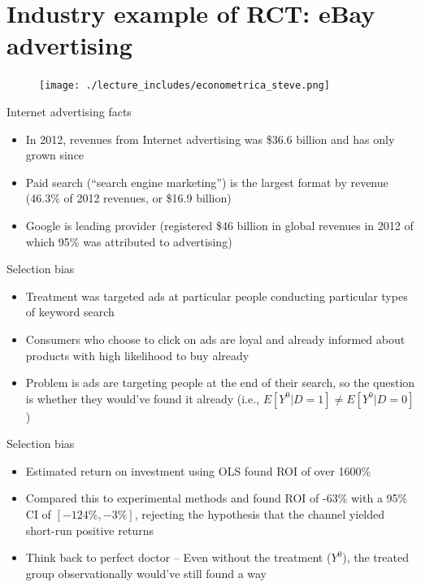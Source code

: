 \documentclass{beamer}
\begin{document}
\section{Industry example of RCT: eBay advertising}

\begin{frame}

\begin{figure}[hpt]
\begin{center}
\texttt{[image: ./lecture\_includes/econometrica\_steve.png]}
\end{center}
\end{figure}

\end{frame}

\begin{frame}{Internet advertising facts}

\begin{itemize}
\item In 2012, revenues from Internet advertising was \$36.6 billion and has only grown since
\item Paid search (``search engine marketing'') is the largest format by revenue (46.3\% of 2012 revenues, or \$16.9 billion)
\item Google is leading provider (registered \$46 billion in global revenues in 2012 of which 95\% was attributed to advertising)
\end{itemize}

\end{frame}

\begin{frame}{Selection bias}

\begin{itemize}
\item Treatment was targeted ads at particular people conducting particular types of keyword search
\item Consumers who choose to click on ads are loyal and already informed about products with high likelihood to buy already 
\item Problem is ads are targeting people at the end of their search, so the question is whether they would've found it already (i.e., $E[Y^0|D=1] \neq E[Y^0|D=0]$)
\end{itemize}


\end{frame}



\begin{frame}{Selection bias}

\begin{itemize}
\item Estimated return on investment using OLS  found ROI of over 1600\%
\item Compared this to experimental methods and found ROI of -63\% with a 95\% CI of $[-124\%, -3\%]$, rejecting the hypothesis that the channel yielded short-run positive returns
\item Think back to perfect doctor -- Even without the treatment ($Y^0$), the treated group observationally would've still found a way
\end{itemize}

\end{frame}
\end{document}
